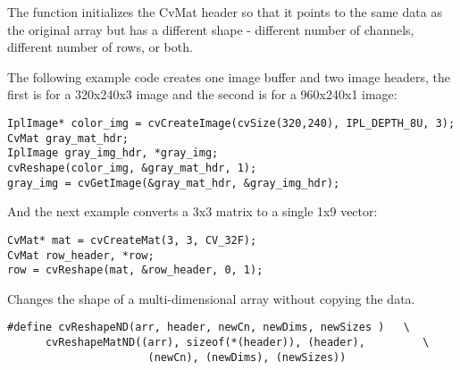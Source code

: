 
\begin{description}
\ifC
{}
\fi
{}
\end{description}

The function initializes the CvMat header so that it points to the same data as the original array but has a different shape - different number of channels, different number of rows, or both.

\ifC
The following example code creates one image buffer and two image headers, the first is for a 320x240x3 image and the second is for a 960x240x1 image:

\begin{lstlisting}
IplImage* color_img = cvCreateImage(cvSize(320,240), IPL_DEPTH_8U, 3);
CvMat gray_mat_hdr;
IplImage gray_img_hdr, *gray_img;
cvReshape(color_img, &gray_mat_hdr, 1);
gray_img = cvGetImage(&gray_mat_hdr, &gray_img_hdr);
\end{lstlisting}

And the next example converts a 3x3 matrix to a single 1x9 vector:

\begin{lstlisting}
CvMat* mat = cvCreateMat(3, 3, CV_32F);
CvMat row_header, *row;
row = cvReshape(mat, &row_header, 0, 1);
\end{lstlisting}
\fi

Changes the shape of a multi-dimensional array without copying the data.


\ifC
\begin{lstlisting}
#define cvReshapeND(arr, header, newCn, newDims, newSizes )   \
      cvReshapeMatND((arr), sizeof(*(header)), (header),         \
                      (newCn), (newDims), (newSizes))
\end{lstlisting}
\fi

